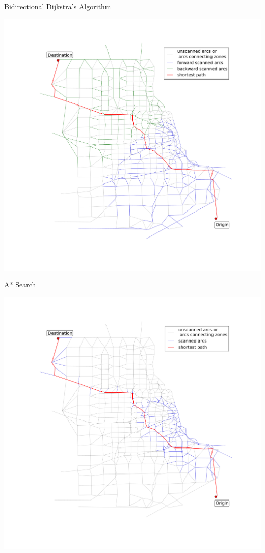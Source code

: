 \documentclass[handout]{beamer}
\begin{document}
\begin{frame}[shrink]{Bidirectional Dijkstra's Algorithm}
    \begin{center}
        \includegraphics[width=\paperwidth, height=\paperheight, keepaspectratio,trim=0 120px 48px 120px,clip]{img/chicago_bidirect}
    \end{center}
\end{frame}

\begin{frame}[shrink]{A* Search}
    \begin{center}
        \includegraphics[width=\paperwidth, height=\paperheight, keepaspectratio,trim=0 120px 48px 120px,clip]{img/chicago_astar}
    \end{center}
\end{frame}
\end{document}
